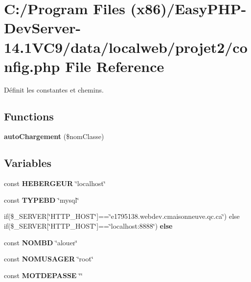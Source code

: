 \hypertarget{config_8php}{}\section{C\+:/\+Program Files (x86)/\+Easy\+P\+H\+P-\/\+Dev\+Server-\/14.1\+V\+C9/data/localweb/projet2/config.php File Reference}
\label{config_8php}


Définit les constantes et chemins.  


\subsection*{Functions}
\begin{DoxyCompactItemize}
\item 
\mbox{\label{config_8php_ad28d4cb45877ca54c3ed47068a802e90}} 
{\bfseries auto\+Chargement} (\$nom\+Classe)
\end{DoxyCompactItemize}
\subsection*{Variables}
\begin{DoxyCompactItemize}
\item 
\mbox{\label{config_8php_ab02f5fd9c53ccd96dd0b118aebe90792}} 
const {\bfseries H\+E\+B\+E\+R\+G\+E\+UR} \char`\"{}localhost\char`\"{}
\item 
\mbox{\label{config_8php_a0dcddaabc6db921d3bb15253e9ead089}} 
const {\bfseries T\+Y\+P\+E\+BD} \char`\"{}mysql\char`\"{}
\item 
if(\$\+\_\+\+S\+E\+R\+V\+ER\mbox{[}\char`\"{}H\+T\+T\+P\+\_\+\+H\+O\+ST\char`\"{}\mbox{]}==\char`\"{}e1795138.\+webdev.\+cmaisonneuve.\+qc.\+ca\char`\"{}) else if(\$\+\_\+\+S\+E\+R\+V\+ER\mbox{[}\char`\"{}H\+T\+T\+P\+\_\+\+H\+O\+ST\char`\"{}\mbox{]}==\char`\"{}localhost\+:8888\char`\"{}) {\bfseries else}
\item 
\mbox{\label{config_8php_a568eaecbf5f200aa3a2906f73e9056e2}} 
const {\bfseries N\+O\+M\+BD} \char`\"{}alouer\char`\"{}
\item 
\mbox{\label{config_8php_a8d71564994874100c41b1f07ab8571c2}} 
const {\bfseries N\+O\+M\+U\+S\+A\+G\+ER} \char`\"{}root\char`\"{}
\item 
\mbox{\label{config_8php_ac08a693f62b79ba075b6052215f8f5d7}} 
const {\bfseries M\+O\+T\+D\+E\+P\+A\+S\+SE} \char`\"{}\char`\"{}
\end{DoxyCompactItemize}


